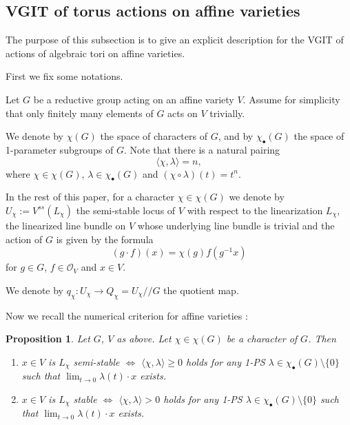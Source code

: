 \documentclass[12pt,twoside]{amsart}
\newtheorem{prop}[theo]{Proposition}
\theoremstyle{definition}
\newcommand\OO{\mathcal{O}}
\begin{document}
\subsection{VGIT of torus actions on affine varieties}
\label{VGIT of torus actions on affine varieties}
The purpose of this subsection is to give an explicit description
for the VGIT of actions of algebraic tori on affine varieties.

First we fix some notations.

Let $G$ be a reductive group acting on an affine variety $V$. Assume for simplicity that
only finitely many elements of $G$ acts on $V$ trivially.

We denote by $\chi{(G)}$ the space of characters of $G$, and by $\chi_{\bullet}{(G)}$ the
space of 1-parameter subgroups of $G$. Note that there is a natural pairing
\begin{equation*}
\langle \chi, \lambda\rangle=n,
\end{equation*}
where $\chi\in\chi{(G)}$, $\lambda\in\chi_{\bullet}{(G)}$ and $(\chi\circ\lambda)(t)=t^{n}$.

In the rest of this paper, for a character $\chi\in\chi{(G)}$
we denote by $U_{\chi}:=V^{ss}(L_{\chi})$ the semi-stable locus
of $V$ with respect to the linearization $L_{\chi}$, the linearized
line bundle on $V$ whose underlying line bundle is trivial and the action of $G$ is
given by the formula 
\begin{equation*}
(g\cdot f)(x)=\chi{(g)}f(g^{-1}x)
\end{equation*}
for $g\in G$, $f\in \OO_V$ and $x\in V$.

We denote by $q_{\chi}:U_{\chi}\to Q_{\chi}=U_{\chi}//G$ the quotient map.


Now we recall the numerical criterion for affine varieties \cite[Proposition 2.5]{k}:

\begin{prop}\label{King}
Let $G$, $V$ as above. Let $\chi\in\chi (G)$ be
a character of $G$. Then 
\begin{enumerate}
\item $x\in V$ is $L_{\chi}$ semi-stable $\iff$
$\langle \chi, \lambda\rangle\ge 0$ holds 
for any 1-PS
$\lambda\in\chi_{\bullet}(G)\setminus\{0\}$
such that $\lim_{t\to 0}\lambda (t)\cdot x$ exists.

\item $x\in V$ is $L_{\chi}$ stable $\iff$
$\langle \chi, \lambda\rangle> 0$ holds 
for any 1-PS $\lambda\in\chi_{\bullet}(G)\setminus\{0\}$
such that $\lim_{t\to 0}\lambda (t)\cdot x$ exists.
\end{enumerate}
\end{prop}
\end{document}
